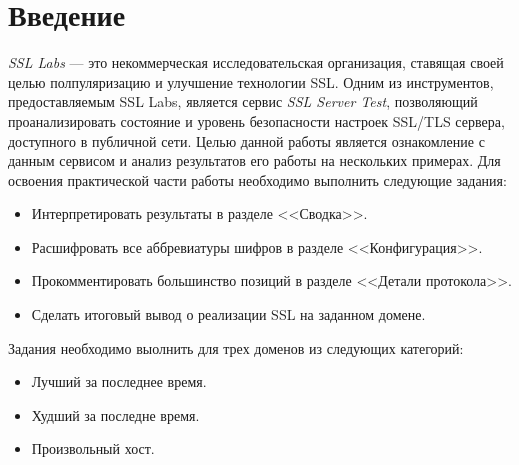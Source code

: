 \section{Введение}

\emph{SSL Labs} --- это некоммерческая исследовательская организация, ставящая своей целью полпуляризацию и улучшение технологии SSL.
Одним из инструментов, предоставляемым SSL Labs, является сервис \emph{SSL Server Test}, позволяющий проанализировать состояние и
уровень безопасности настроек SSL/TLS сервера, доступного в публичной сети. Целью данной работы является ознакомление с данным 
сервисом и анализ результатов его работы на нескольких примерах. Для освоения практической части работы необходимо выполнить следующие
задания:
\begin{itemize}
    \item Интерпретировать результаты в разделе <<Сводка>>.
    \item Расшифровать все аббревиатуры шифров в разделе <<Конфигурация>>.
    \item Прокомментировать большинство позиций в разделе <<Детали протокола>>.
    \item Сделать итоговый вывод о реализации SSL на заданном домене.
\end{itemize}
Задания необходимо выолнить для трех доменов из следующих категорий: 
\begin{itemize}
    \item Лучший за последнее время.
    \item Худший за последне время.
    \item Произвольный хост.
\end{itemize}